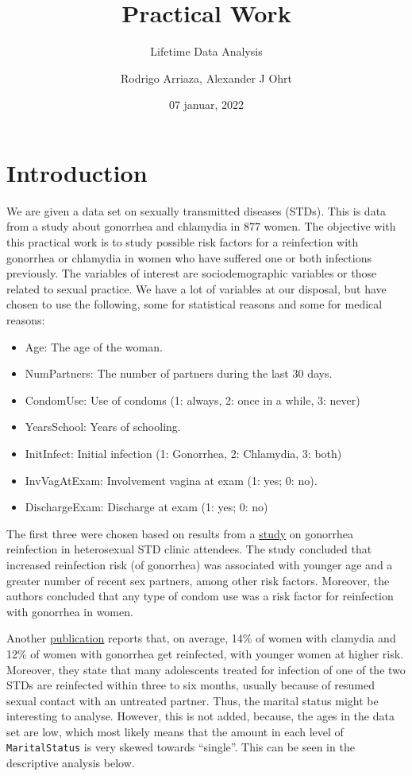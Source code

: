 \documentclass[
]{article}
\title{Practical Work}
\subtitle{Lifetime Data Analysis}
\author{Rodrigo Arriaza, Alexander J Ohrt}
\date{07 januar, 2022}
\providecommand{\tightlist}{%
  \setlength{\itemsep}{0pt}\setlength{\parskip}{0pt}}
\begin{document}
\maketitle

\hypertarget{introduction}{%
\section{Introduction}\label{introduction}}

We are given a data set on sexually transmitted diseases (STDs). This is data from a study about gonorrhea and chlamydia in 877 women. The objective with this practical work is to study possible risk factors for a reinfection with gonorrhea or chlamydia in women who have suffered one or both infections previously. The variables of interest are sociodemographic variables or those related to sexual practice. We have a lot of variables at our disposal, but have chosen to use the following, some for statistical reasons and some for medical reasons:

\begin{itemize}
\tightlist
\item
  Age: The age of the woman.
\item
  NumPartners: The number of partners during the last 30 days.
\item
  CondomUse: Use of condoms (1: always, 2: once in a while, 3: never)
\item
  YearsSchool: Years of schooling.
\item
  InitInfect: Initial infection (1: Gonorrhea, 2: Chlamydia, 3: both)
\item
  InvVagAtExam: Involvement vagina at exam (1: yes; 0: no).
\item
  DischargeExam: Discharge at exam (1: yes; 0: no)
\end{itemize}

The first three were chosen based on results from a \href{https://www.ncbi.nlm.nih.gov/pmc/articles/PMC1744639/}{study} on gonorrhea reinfection in heterosexual STD clinic attendees. The study concluded that increased reinfection risk (of gonorrhea) was associated with younger age and a greater number of recent sex partners, among other risk factors. Moreover, the authors concluded that any type of condom use was a risk factor for reinfection with gonorrhea in women.

Another \href{https://policylab.chop.edu/sites/default/files/pdf/publications/Preventing_Chlamydia_Gonorrhea_Reinfection_through_Increased_Use_of_EPT.pdf}{publication} reports that, on average, 14\% of women with clamydia and 12\% of women with gonorrhea get reinfected, with younger women at higher risk. Moreover, they state that many adolescents treated for infection of one of the two STDs are reinfected within three to six months, usually because of resumed sexual contact with an untreated partner. Thus, the marital status might be interesting to analyse. However, this is not added, because, the ages in the data set are low, which most likely means that the amount in each level of \texttt{MaritalStatus} is very skewed towards ``single''. This can be seen in the descriptive analysis below.
\end{document}
